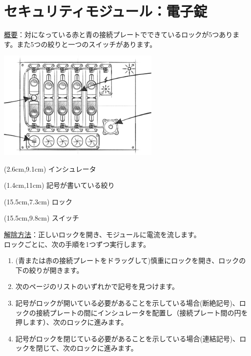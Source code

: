 \section*{セキュリティモジュール：電子錠}


\uline{概要}：対になっている赤と青の接続プレートでできているロックが5つあります。また5つの絞りと一つのスイッチがあります。

\begin{center}
    \includegraphics[width=0.6\textwidth]{images/13.png}
\end{center}

\begin{textblock*}{5cm}(2.6cm,9.1cm)
    \tegakifont インシュレータ
\end{textblock*}
\begin{textblock*}{5cm}(1.4cm,11cm)
    \tegakifont 記号が書いている絞り
\end{textblock*}
\begin{textblock*}{5cm}(15.5cm,7.3cm)
    \tegakifont ロック
\end{textblock*}
\begin{textblock*}{5cm}(15.5cm,9.8cm)
    \tegakifont スイッチ
\end{textblock*}


\uline{解除方法}：正しいロックを開き{、}モジュールに電流を流します。\\
ロックごとに{、}次の手順を1つずつ実行します。\\
\begin{enumerate}
    \item (青または赤の接続プレートをドラッグして)慎重にロックを開き{、}ロックの下の絞りが開きます。
    \item 次のページのリストのいずれかで記号を見つけます。
    \item 記号がロックが開いている必要があることを示している場合(断絶記号){、}ロックの接続プレートの間にインシュレータを配置し（接続プレート間の円を押します）{、}次のロックに進みます。
    \item 記号がロックを閉じている必要があることを示している場合(連結記号){、}ロックを閉じて{、}次のロックに進みます。
\end{enumerate}

